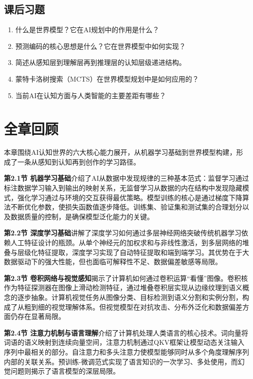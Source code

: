 \bigskip
\subsection*{课后习题}

\begin{enumerate}
\setlength{\itemsep}{6pt}
\item 什么是世界模型？它在AI规划中的作用是什么？
\item 预测编码的核心思想是什么？它在世界模型中如何实现？
\item 简述从感知层到理解层再到推理层的认知层级递进结构。
\item 蒙特卡洛树搜索（MCTS）在世界模型规划中是如何应用的？
\item 当前AI在认知方面与人类智能的主要差距有哪些？
\end{enumerate}

\section*{全章回顾}

本章围绕AI认知世界的六大核心能力展开，从机器学习基础到世界模型构建，形成了一条从感知到认知再到创作的学习路径。

\textbf{第2.1节 机器学习基础}介绍了AI从数据中发现规律的三种基本范式：监督学习通过标注数据学习输入到输出的映射关系，无监督学习从数据的内在结构中发现隐藏模式，强化学习通过与环境的交互获得最优策略。模型训练的核心是通过梯度下降算法不断优化参数，使损失函数值逐步降低。训练集、验证集和测试集的合理划分以及数据质量的控制，是确保模型泛化能力的关键。

\textbf{第2.2节 深度学习基础}讲解了深度学习如何通过多层神经网络突破传统机器学习依赖人工特征设计的瓶颈。从单个神经元的加权求和与非线性激活，到多层网络的堆叠与层级化特征提取，深度学习实现了自动特征提取和端到端学习。其优势在于大数据驱动下的强大性能，但也面临可解释性不足、数据偏差敏感等局限。

\textbf{第2.3节 卷积网络与视觉感知}揭示了计算机如何通过卷积运算“看懂”图像。卷积核作为特征探测器在图像上滑动检测特征，通过堆叠卷积层实现从边缘纹理到语义概念的逐步抽象。计算机视觉任务从图像分类、目标检测到语义分割和实例分割，构成了从粗到细的视觉理解体系。但视觉模型在对抗攻击、分布外泛化和数据偏差方面仍存在显著局限。

\textbf{第2.4节 注意力机制与语言理解}介绍了计算机处理人类语言的核心技术。词向量将词语的语义映射到连续向量空间，注意力机制通过QKV框架让模型动态关注输入序列中最相关的部分。自注意力和多头注意力使模型能够同时从多个角度理解序列内部的关联关系。预训练-微调范式实现了语言知识的一次学习、多处使用，而幻觉问题则揭示了语言模型的深层局限。

